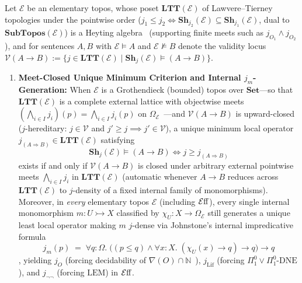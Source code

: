 \begin{theorem}\label{thm:ltt-residuum}%
%
Let $\mathcal{E}$ be an elementary topos, whose poset $\mathbf{LTT}(\mathcal{E})$ of Lawvere--Tierney topologies under the pointwise order ($j_1 \le j_2 \iff \mathbf{Sh}_{j_2}(\mathcal{E}) \subseteq \mathbf{Sh}_{j_1}(\mathcal{E})$, dual to $\mathbf{SubTopos}(\mathcal{E})$) is a Heyting algebra~\cite[\S A4.5]{Johnstone02} (supporting finite meets such as $j_{O_1} \wedge j_{O_2}$), and for sentences $A, B$ with $\mathcal{E} \models A$ and $\mathcal{E} \not\models B$ denote the validity locus $\mathcal{V}(A \to B) := \{j \in \mathbf{LTT}(\mathcal{E}) \mid \mathbf{Sh}_j(\mathcal{E}) \models (A \to B)\}$.
\begin{enumerate}

  \item \textbf{Meet-Closed Unique Minimum Criterion and Internal $j_m$-Generation:} When $\mathcal{E}$ is a Grothendieck (bounded) topos over $\mathbf{Set}$---so that $\mathbf{LTT}(\mathcal{E})$ is a complete external lattice with objectwise meets $(\bigwedge_{i \in I} j_i)(p) = \bigwedge_{i \in I} j_i(p)$ on $\Omega_{\mathcal{E}}$~\cite[\S A4.5]{Johnstone02}---and $\mathcal{V}(A \to B)$ is upward-closed ($j$-hereditary: $j \in \mathcal{V}$ and $j' \ge j \implies j' \in \mathcal{V}$), a unique minimum local operator $j_{(A \Rightarrow B)} \in \mathbf{LTT}(\mathcal{E})$ satisfying
  \[
    \mathbf{Sh}_j(\mathcal{E}) \models (A \to B) \iff j \ge j_{(A \Rightarrow B)}
  \]
  exists if and only if $\mathcal{V}(A \to B)$ is closed under arbitrary external pointwise meets $\bigwedge_{i \in I} j_i$ in $\mathbf{LTT}(\mathcal{E})$ (automatic whenever $A \to B$ reduces across $\mathbf{LTT}(\mathcal{E})$ to $j$-density of a fixed internal family of monomorphisms). Moreover, in \emph{every} elementary topos $\mathcal{E}$ (including $\mathcal{E}\mathrm{ff}$), every single internal monomorphism $m : U \rightarrowtail X$ classified by $\chi_U : X \to \Omega_{\mathcal{E}}$ still generates a unique least local operator making $m$ $j$-dense via Johnstone's internal impredicative formula
  \[
    j_m(p) \;=\; \forall q : \Omega.\; \bigl((p \le q) \wedge \forall x : X.\; (\chi_U(x) \to q) \to q\bigr) \to q
  \]
  \cite[A4.5]{Johnstone02}, yielding $j_O$ (forcing decidability of $\nabla(O) \cap \mathbb{N}$~\cite{LeeVanOosten13}), $j_{\mathrm{Lif}}$ (forcing $\Pi^0_1 \lor \Pi^0_1\text{-}\mathrm{DNE}$), and $j_{\neg\neg}$ (forcing $\mathrm{LEM}$) in $\mathcal{E}\mathrm{ff}$.


\end{enumerate}
\end{theorem}
